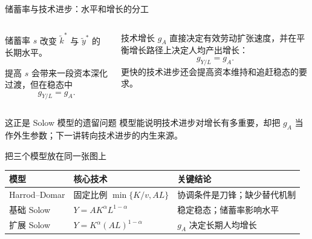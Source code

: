 \documentclass[aspectratio=32]{beamer}
\begin{document}
\begin{frame}{储蓄率与技术进步：水平和增长的分工}
\small
\begin{columns}[T]
\begin{block}{储蓄率 $s$}
改变 $\tilde k^*$ 与 $\tilde y^*$ 的长期水平。\par\vspace{0.1cm}
提高 $s$ 会带来一段资本深化过渡，但在稳态中
\[
  g_{Y/L}=g_A.
\]
\end{block}
\begin{block}{技术增长 $g_A$}
直接决定有效劳动扩张速度，并在平衡增长路径上决定人均产出增长：
\[
  g_{Y/L}=g_A.
\]
更快的技术进步还会提高资本维持和追赶稳态的要求。
\end{block}
\end{columns}
\vspace{0.2cm}
\begin{alertblock}{这正是 Solow 模型的遗留问题}
模型能说明技术进步对增长有多重要，却把 $g_A$ 当作外生参数；下一讲转向技术进步的内生来源。
\end{alertblock}
\end{frame}

\begin{frame}{把三个模型放在同一张图上}
\small
\begin{table}
\centering
\begin{tabular}{p{}p{}p{}}
\toprule
模型 & 核心技术 & 关键结论 \\
\midrule
Harrod--Domar & 固定比例 $\min\{K/v,AL\}$ & 协调条件是刀锋；缺少替代机制 \\
基础 Solow & $Y=AK^\alpha L^{1-\alpha}$ & 稳定稳态；储蓄率影响水平 \\
扩展 Solow & $Y=K^\alpha(AL)^{1-\alpha}$ & $g_A$ 决定长期人均增长 \\
\bottomrule
\end{tabular}
\end{table}
\vspace{0.25cm}
\begin{center}
\end{center}
\end{frame}
\end{document}
